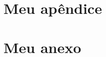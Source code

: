 

\frontmatter
\maketitlepage		%
\approval			%
\dedication			%
\acknowledgment		%
\printepigraph		%
\printabstract		%
\printengabstract	%
\printlof			%
\printlot			%
\printloa			%
\printtoc			%


\mainmatter







\backmatter
\printbibliography

\appendix
\chapter{Meu apêndice}


\attachment
\chapter{Meu anexo}




